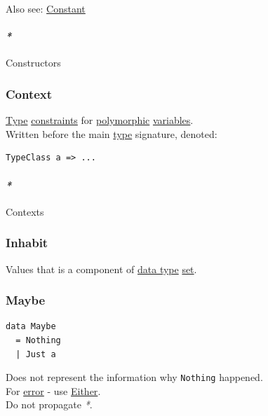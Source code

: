 \documentclass[11pt]{article}
\begin{document}
Also see: \hyperref[org6cc4f99]{Constant}\\

\paragraph{\emph{*}}
\label{sec:org7dc9452}

\label{orgc5bd814}Constructors\\

\subsubsection{\label{orgd623681}Context}
\label{sec:orgd818c4a}
\hyperref[org4fbaeb8]{Type} \hyperref[org76311a9]{constraints} for \hyperref[org84d7fee]{polymorphic} \hyperref[orgd3f3ade]{variables}.\\
Written before the main \hyperref[org4fbaeb8]{type} signature, denoted:\\
\begin{verbatim}
TypeClass a => ...
\end{verbatim}

\paragraph{\emph{*}}
\label{sec:org6158871}

\label{orgfad9713}Contexts\\

\subsubsection{\label{org57e1f17}Inhabit}
\label{sec:org779867e}
Values that is a component of \hyperref[org965cde3]{data type} \hyperref[orgbed80ba]{set}.\\

\subsubsection{\label{orga420584}Maybe}
\label{sec:org6bc1866}
\begin{verbatim}
data Maybe
  = Nothing
  | Just a
\end{verbatim}

Does not represent the information why \texttt{Nothing} happened.\\
For \hyperref[orgb69b647]{error} - use \hyperref[orgbc5fdf7]{Either}.\\
Do not propagate \emph{*}.\\
\end{document}

